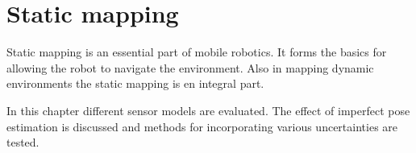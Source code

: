 \chapter{Static mapping}
Static mapping is an essential part of mobile robotics. It forms the basics for allowing the robot to navigate the environment. 
Also in mapping dynamic environments the static mapping is en integral part. 

In this chapter different sensor models are evaluated. The effect of imperfect pose estimation is discussed and methods for incorporating various uncertainties are tested. 






